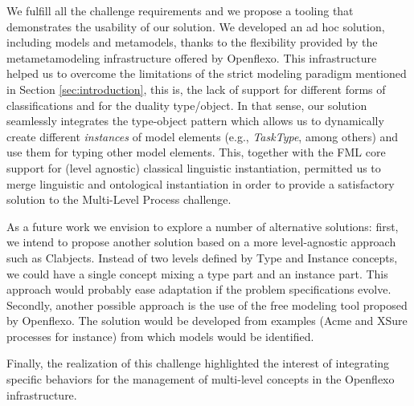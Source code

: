 

We fulfill all the challenge requirements and we propose a tooling that
demonstrates the usability of our solution. We developed an ad hoc solution,
including models and metamodels, thanks to the flexibility provided by the
metametamodeling infrastructure offered by Openflexo. This infrastructure helped us to overcome the limitations of the strict modeling paradigm mentioned in Section \ref{sec:introduction}, this is, the lack of support for different forms of classifications and for the duality type/object. In that sense, our solution seamlessly integrates the type-object pattern which allows us to dynamically create different \emph{instances} of model elements (e.g., \emph{TaskType}, among others) and use them for typing other model elements. This, together with the FML core support for (level agnostic) classical linguistic instantiation, permitted us to merge linguistic and ontological instantiation in order to provide a satisfactory solution to the Multi-Level Process challenge.


As a future work we envision to explore a number of alternative solutions:
first, we intend to propose another solution based on a more level-agnostic
approach such as Clabjects. Instead of two levels defined by Type and Instance
concepts, we could have a single concept mixing a type part and an instance
part. This approach would probably ease adaptation if the problem
specifications evolve. Secondly, another possible approach is the use of the
free modeling tool proposed by Openflexo. The solution would be developed from
examples (Acme and XSure processes for instance) from which models would be
identified. 

Finally, the realization of this challenge highlighted the interest
of integrating specific behaviors for the management of multi-level concepts in
the Openflexo infrastructure. %
